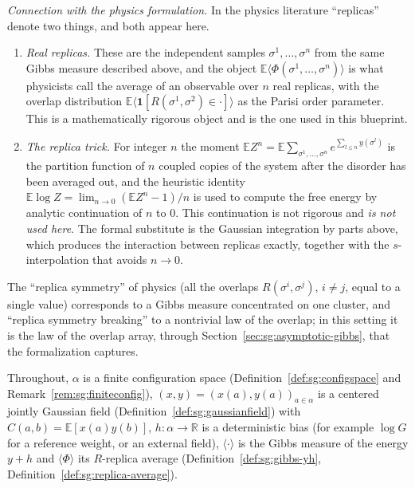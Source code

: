 \begin{remark}
\emph{Connection with the physics formulation.} In the physics literature ``replicas'' denote two things, and both appear
here.
\begin{enumerate}
\item[(i)] \emph{Real replicas.} These are the independent samples $\sigma^1,\dots,\sigma^n$ from the same Gibbs measure
  described above, and the object $\mathbb E\langle\Phi(\sigma^1,\dots,\sigma^n)\rangle$ is what physicists call the average of
  an observable over $n$ real replicas, with the overlap distribution $\mathbb E\langle\mathbf 1[R(\sigma^1,\sigma^2)\in\cdot]\rangle$
  as the Parisi order parameter. This is a mathematically rigorous object and is the one used in this blueprint.
\item[(ii)] \emph{The replica trick.} For integer $n$ the moment $\mathbb EZ^n=\mathbb E\sum_{\sigma^1,\dots,\sigma^n}
  e^{\sum_{l\le n}y(\sigma^l)}$ is the partition function of $n$ coupled copies of the system after the disorder has been averaged
  out, and the heuristic identity $\mathbb E\log Z=\lim_{n\to0}(\mathbb EZ^n-1)/n$ is used to compute the free energy by analytic
  continuation of $n$ to $0$. This continuation is not rigorous and \emph{is not used here}. The formal substitute is the
  Gaussian integration by parts above, which produces the interaction between replicas exactly, together with the
  $s$-interpolation that avoids $n\to0$.
\end{enumerate}
The ``replica symmetry'' of physics (all the overlaps $R(\sigma^i,\sigma^j)$, $i\ne j$, equal to a single value) corresponds to
a Gibbs measure concentrated on one cluster, and ``replica symmetry breaking'' to a nontrivial law of the overlap; in this
setting it is the law of the overlap array, through Section~\ref{sec:sg:asymptotic-gibbs}, that the formalization captures.
\end{remark}

Throughout, $\alpha$ is a finite configuration space (Definition~\ref{def:sg:configspace} and
Remark~\ref{rem:sg:finiteconfig}), $(x,y)=(x(a),y(a))_{a\in\alpha}$ is a centered jointly Gaussian field
(Definition~\ref{def:sg:gaussianfield}) with $C(a,b)=\mathbb E[x(a)y(b)]$, $h:\alpha\to\mathbb R$ is a deterministic bias
(for example $\log G$ for a reference weight, or an external field), $\langle\cdot\rangle$ is the Gibbs measure of the energy
$y+h$ and $\langle\Phi\rangle$ its $R$-replica average (Definition~\ref{def:sg:gibbs-yh}, Definition~\ref{def:sg:replica-average}).

